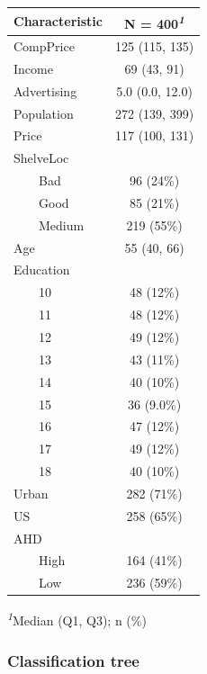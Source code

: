 \documentclass[
]{article}
\begin{document}
\begin{table}
\fontsize{12.0pt}{14.4pt}\selectfont
\begin{tabular*}{\linewidth}{@{\extracolsep{\fill}}lc}
\toprule
\textbf{Characteristic} & \textbf{N = 400}\textsuperscript{\textit{1}} \\ 
\midrule\addlinespace[2.5pt]
CompPrice & 125 (115, 135) \\ 
Income & 69 (43, 91) \\ 
Advertising & 5.0 (0.0, 12.0) \\ 
Population & 272 (139, 399) \\ 
Price & 117 (100, 131) \\ 
ShelveLoc &  \\ 
    Bad & 96 (24\%) \\ 
    Good & 85 (21\%) \\ 
    Medium & 219 (55\%) \\ 
Age & 55 (40, 66) \\ 
Education &  \\ 
    10 & 48 (12\%) \\ 
    11 & 48 (12\%) \\ 
    12 & 49 (12\%) \\ 
    13 & 43 (11\%) \\ 
    14 & 40 (10\%) \\ 
    15 & 36 (9.0\%) \\ 
    16 & 47 (12\%) \\ 
    17 & 49 (12\%) \\ 
    18 & 40 (10\%) \\ 
Urban & 282 (71\%) \\ 
US & 258 (65\%) \\ 
AHD &  \\ 
    High & 164 (41\%) \\ 
    Low & 236 (59\%) \\ 
\bottomrule
\end{tabular*}
\begin{minipage}{\linewidth}
\textsuperscript{\textit{1}}Median (Q1, Q3); n (\%)\\
\end{minipage}
\end{table}

\hypertarget{classification-tree}{%
\subsubsection{Classification tree}\label{classification-tree}}
\end{document}
